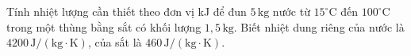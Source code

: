 \begin{ex}
Tính nhiệt lượng cần thiết theo đơn vị kJ để đun $5\,\mathrm{kg}$ nước từ $15^\circ\mathrm{C}$ đến $100^\circ\mathrm{C}$ trong một thùng bằng sắt có khối lượng $1{,}5\,\mathrm{kg}$. Biết nhiệt dung riêng của nước là $4200\,\mathrm{J/(kg\cdot K)}$, của sắt là $460\,\mathrm{J/(kg\cdot K)}$.
\end{ex}
